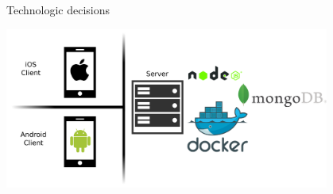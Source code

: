 \documentclass[11pt]{beamer}
\begin{document}
\begin{frame}{Technologic decisions}

  \begin{center}
    \includegraphics[width=0.8\textwidth]{tech-stack-big-picture}
  \end{center}


\end{frame}
\end{document}
